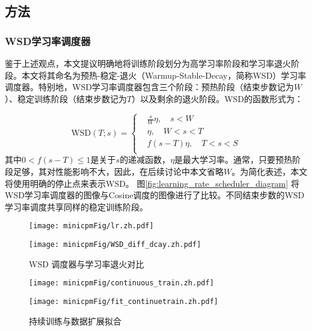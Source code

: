 \subsection{方法}
\subsubsection{WSD学习率调度器}
鉴于上述观点，本文提议明确地将训练阶段划分为高学习率阶段和学习率退火阶段。本文将其命名为预热-稳定-退火（Warmup-Stable-Decay，简称WSD）学习率调度器。特别地，WSD学习率调度器包含三个阶段：预热阶段（结束步数记为$W$）、稳定训练阶段（结束步数记为$T$）以及剩余的退火阶段。WSD的函数形式为：

\begin{equation}
    \text{WSD}(T; s) = \begin{cases}
       & \frac{s}{W} \eta, \quad s<W\\
       & \eta, \quad W < s < T \\
       & f(s-T)\eta,\quad T < s < S\\
    \end{cases}
\end{equation}
其中$0 < f(s - T) \leq 1$是关于$s$的递减函数，$\eta$是最大学习率。通常，只要预热阶段足够，其对性能影响不大，因此，在后续讨论中本文省略$W$。为简化表述，本文将使用明确的停止点来表示WSD。 图\ref{fig:learning_rate_scheduler_diagram} 将WSD学习率调度器的图像与Cosine调度的图像进行了比较。不同结束步数的WSD学习率调度共享同样的稳定训练阶段。

\begin{figure}[htbp]
    \centering
    \begin{minipage}{0.48\linewidth}
        \centering
        \texttt{[image: minicpmFig/lr.zh.pdf]}
        \label{fig:learning_rate_scheduler_diagram}
    \end{minipage}
    \hfill
    \begin{minipage}{0.48\linewidth}
        \centering
        \texttt{[image: minicpmFig/WSD\_diff\_dcay.zh.pdf]}
        \label{fig:wsd_diff_dcay}
    \end{minipage}
    \caption{WSD 调度器与学习率退火对比}
\end{figure}

\begin{figure}[htbp]
    \centering
    \begin{minipage}{0.48\linewidth}
        \centering
        \texttt{[image: minicpmFig/continuous\_train.zh.pdf]}
        \label{fig:continuoustrain}
    \end{minipage}
    \hfill
    \begin{minipage}{0.48\linewidth}
        \centering
        \texttt{[image: minicpmFig/fit\_continuetrain.zh.pdf]}
        \label{fig:fit_continue_train}
    \end{minipage}
    \caption{持续训练与数据扩展拟合}
\end{figure}


